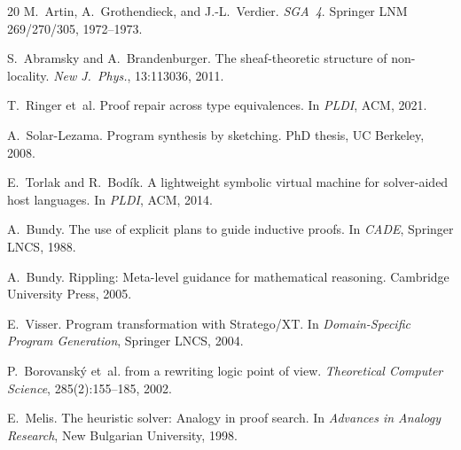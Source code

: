 \documentclass[11pt]{article}
\begin{document}
\begin{thebibliography}{20}
M.~Artin, A.~Grothendieck, and J.-L.~Verdier.
\newblock \emph{SGA~4}.
\newblock Springer LNM 269/270/305, 1972--1973.

S.~Abramsky and A.~Brandenburger.
\newblock The sheaf-theoretic structure of non-locality.
\newblock \emph{New J.\ Phys.}, 13:113036, 2011.

T.~Ringer et~al.
\newblock Proof repair across type equivalences.
\newblock In \emph{PLDI}, ACM, 2021.

A.~Solar-Lezama.
\newblock Program synthesis by sketching.
\newblock PhD thesis, UC Berkeley, 2008.

E.~Torlak and R.~Bod\'{i}k.
\newblock A lightweight symbolic virtual machine for solver-aided
host languages.
\newblock In \emph{PLDI}, ACM, 2014.

A.~Bundy.
\newblock The use of explicit plans to guide inductive proofs.
\newblock In \emph{CADE}, Springer LNCS, 1988.

A.~Bundy.
\newblock Rippling: Meta-level guidance for mathematical reasoning.
\newblock Cambridge University Press, 2005.

E.~Visser.
\newblock Program transformation with {Stratego/XT}.
\newblock In \emph{Domain-Specific Program Generation}, Springer LNCS, 2004.

P.~Borovansk\'{y} et~al.
 from a rewriting logic point of view.
\newblock \emph{Theoretical Computer Science}, 285(2):155--185, 2002.

E.~Melis.
\newblock The heuristic solver: Analogy in proof search.
\newblock In \emph{Advances in Analogy Research}, New Bulgarian University, 1998.

\end{thebibliography}
\end{document}
